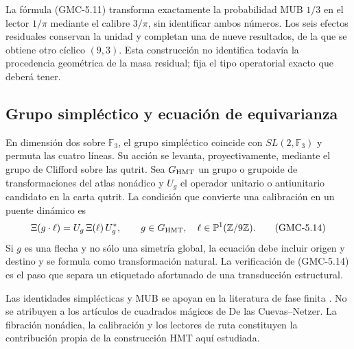 \begin{bridgebox}
La fórmula \textup{(GMC-5.11)} transforma exactamente la probabilidad MUB $1/3$ en
el lector $1/\pi$ mediante el calibre $3/\pi$, sin identificar ambos números.
Los seis efectos residuales conservan la unidad y completan una \POVM de
nueve resultados, de la que se obtiene otro \QMS cíclico $(9,3)$. Esta
construcción no identifica todavía la procedencia geométrica de la masa
residual; fija el tipo operatorial exacto que deberá tener.
\end{bridgebox}

\subsection{Grupo simpléctico y ecuación de equivarianza}

En dimensión dos sobre $\mathbb F_3$, el grupo simpléctico coincide con
$SL(2,\mathbb F_3)$ y permuta las cuatro líneas. Su acción se levanta,
proyectivamente, mediante el grupo de Clifford sobre las \PVM qutrit. Sea
$G_{\rm HMT}$ un grupo o grupoide de transformaciones del atlas nonádico y
$U_g$ el operador unitario o antiunitario candidato en la carta qutrit. La
condición que convierte una calibración en un puente dinámico es
\[
 \Xi(g\cdot\ell)=U_g\,\Xi(\ell)\,U_g^*,
 \qquad
 g\in G_{\rm HMT},\quad
 \ell\in\mathbb P^1(\mathbb Z/9\mathbb Z).
\tag{GMC-5.14}
\]
Si $g$ es una flecha y no sólo una simetría global, la ecuación debe incluir
origen y destino y se formula como transformación natural. La verificación de
\textup{(GMC-5.14)} es el paso que separa un etiquetado afortunado de una
transducción estructural.

\begin{sourcebox}
Las identidades simplécticas y MUB se apoyan en la literatura de fase finita
\citep{gibbons2004phase,planat2007rings}. No se atribuyen a los artículos de
cuadrados mágicos de De las Cuevas--Netzer. La fibración nonádica, la
calibración y los lectores de ruta constituyen la contribución propia de la
construcción HMT aquí estudiada.
\end{sourcebox}
